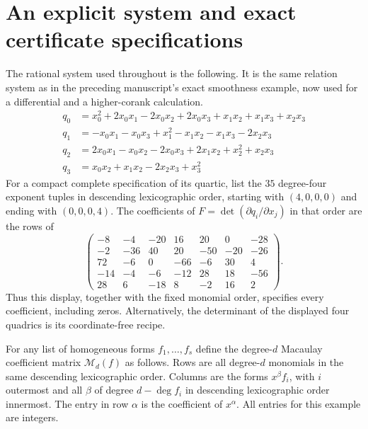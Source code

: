 \section{An explicit system and exact certificate specifications}
\label{sec:certificates}
The rational system used throughout is the following. It is the same
relation system as in the preceding manuscript's exact smoothness
example, now used for a differential and a higher-corank calculation.
\begin{align*}
q_{0}&=x_{0}^{2} + 2 x_{0} x_{1} - 2 x_{0} x_{2} + 2 x_{0} x_{3} + x_{1} x_{2} + x_{1} x_{3} + x_{2} x_{3}\\
q_{1}&=- x_{0} x_{1} - x_{0} x_{3} + x_{1}^{2} - x_{1} x_{2} - x_{1} x_{3} - 2 x_{2} x_{3}\\
q_{2}&=2 x_{0} x_{1} - x_{0} x_{2} - 2 x_{0} x_{3} + 2 x_{1} x_{2} + x_{2}^{2} + x_{2} x_{3}\\
q_{3}&=x_{0} x_{2} + x_{1} x_{2} - 2 x_{2} x_{3} + x_{3}^{2}
\end{align*}
For a compact complete specification of its quartic, list the $35$
degree-four exponent tuples in descending lexicographic order, starting
with $(4,0,0,0)$ and ending with $(0,0,0,4)$. The coefficients of
$F=\det(\partial q_i/\partial x_j)$ in that order are the rows of
\[
\begin{pmatrix}-8 & -4 & -20 & 16 & 20 & 0 & -28\\-2 & -36 & 40 & 20 & -50 & -20 & -26\\72 & -6 & 0 & -66 & -6 & 30 & 4\\-14 & -4 & -6 & -12 & 28 & 18 & -56\\28 & 6 & -18 & 8 & -2 & 16 & 2\end{pmatrix}.
\]
Thus this display, together with the fixed monomial order, specifies
every coefficient, including zeros. Alternatively, the determinant
of the displayed four quadrics is its coordinate-free recipe.

For any list of homogeneous forms $f_1,\ldots,f_s$ define the degree-$d$
Macaulay coefficient matrix $\mathcal M_d(f)$ as follows. Rows are
all degree-$d$ monomials in the same descending lexicographic order.
Columns are the forms $x^\beta f_i$, with $i$ outermost and all
$\beta$ of degree $d-\deg f_i$ in descending lexicographic order
innermost. The entry in row $\alpha$ is the coefficient of $x^\alpha$.
All entries for this example are integers.

